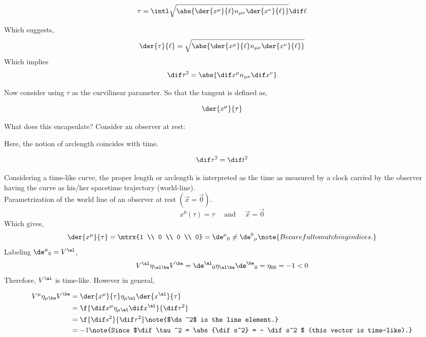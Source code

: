 \documentclass{article}
\begin{document}
\[ \tau = \intl \sqrt{\abs{\der{x^\mu}{\ell} n_{\mu\nu} \der{x^\nu}{\ell}}} \dif \ell \]

Which suggests,
\[ \der{\tau}{\ell} = \sqrt{\abs{\der{x^\mu}{\ell} n_{\mu\nu} \der{x^\nu}{\ell}}} \]
Which implies
\[ \dif \tau ^2 = \abs{\dif x^\mu n_{\mu\nu} \dif x^\nu} \]

Now consider using $\tau$ as the curvilinear parameter. So that the tangent is defined as,

\[ \der{x^\mu}{\tau} \]

What does this encapsulate? Consider an observer at rest:

\begin{center}
\end{center}

Here, the notion of arclength coincides with time.

\[ \dif \tau^2 = \dif t^2 \]

Considering a time-like curve, the proper length or arclength is interpreted as the time as measured by a clock carried by the observer having the curve as his/her spacetime trajectory (world-line). \\

Parametrization of the world line of an observer at rest $(\vec{x} = \vec{0})$.
\[ x^0(\tau) = \tau \quad \text{ and } \quad \vec{x} = \vec{0} \]
Which gives,
\[ \der{x^\mu}{\tau} = \mtrx{1 \\ 0 \\ 0 \\ 0} = {\de^\mu}_0 \neq {\de^0}_\mu \note{Be careful to matching indices.} \]
Labeling ${\de^\mu}_0 = V^\al$,
\[ V^\al \eta_{\al\be} V^\be = {\de^\al}_0 \eta_{\al\be} {\de^\be}_0 = \eta_{00}= -1 < 0  \]
Therefore, $V^\al$ is time-like. However in general,

\begin{align*}
V^\mu \eta_{\mu\be} V^\be &= \der{x^\mu}{\tau}  \eta_{\mu\al} \der{x^\al}{\tau}\\
&= \f{\dif x^\mu\eta_{\mu\al} \dif x^\al}{\dif \tau^2}\\
&= \f{\dif s^2}{\dif \tau^2} \note{$\ds^2$ is the line element.}\\
&= -1 \note{Since $\dif \tau^2 = \abs{\dif s^2} = - \dif s^2 $ (this vector is time-like).}\\
\end{align*}
\end{document}
